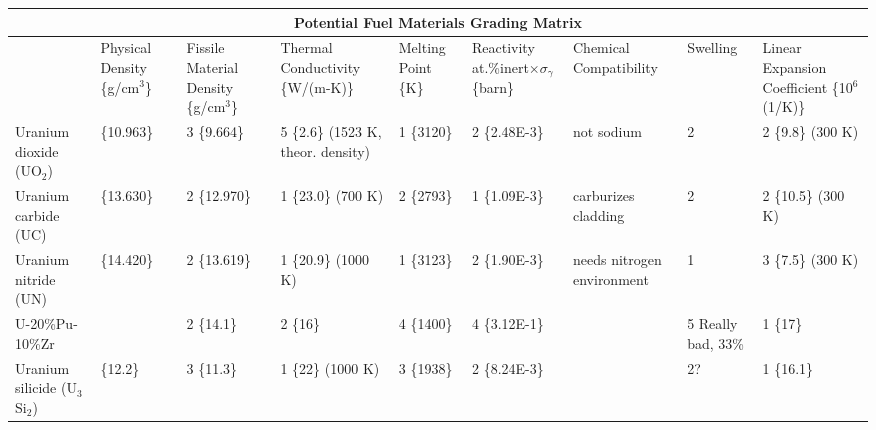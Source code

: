 \documentclass[]{report}
\begin{document}
\begin{center}
\hspace*{-2cm} %
\begin{tabular}[c]{| p{1.6cm} | p{1.2cm} | p{1.9cm} | p{2.05cm} | p{1.5cm} | p{2.0cm} | p{1.5cm} | p{1.5cm} | p{2cm} |}
\hline
\multicolumn{9}{|c|}{Potential Fuel Materials Grading Matrix} \\
\hline
 & Physical Density \{g/cm$^3$\} & Fissile Material Density \{g/cm$^3$\} & Thermal Conductivity  \{W/(m-K)\} & Melting Point \{K\} & Reactivity at.\%inert$\times \sigma_{\gamma}$ \{barn\} & Chemical Compatibility & Swelling & Linear Expansion Coefficient \{10$^6$(1/K)\} \\
\hline
Uranium dioxide (UO$_2$) & \{10.963\} & 3 \{9.664\} & 5 \{2.6\} (1523 K, theor. density) & 1 \{3120\} & 2 \{2.48E-3\} & not sodium & 2 & 2 \{9.8\} (300 K)  \\
\hline
Uranium carbide (UC) & \{13.630\} & 2 \{12.970\} & 1 \{23.0\} (700 K) & 2 \{2793\} & 1 \{1.09E-3\} & carburizes cladding & 2 & 2 \{10.5\} (300 K)\\
\hline
Uranium nitride (UN) & \{14.420\} & 2 \{13.619\} & 1 \{20.9\} (1000 K) & 1 \{3123\} & 2 \{1.90E-3\} & needs nitrogen environment & 1 & 3 \{7.5\} (300 K) \\
\hline
U-20\%Pu-10\%Zr & & 2 \{14.1\} & 2 \{16\} & 4 \{1400\} & 4 \{3.12E-1\} &  & 5 Really bad, 33\% & 1 \{17\}\\
\hline
Uranium silicide (U$_3$Si$_2$)  & \{12.2\} & 3 \{11.3\} & 1 \{22\} (1000 K) & 3 \{1938\} & 2 \{8.24E-3\} & & 2? & 1 \{16.1\}\\
\hline

\end{tabular}
\end{center}
\end{document}
